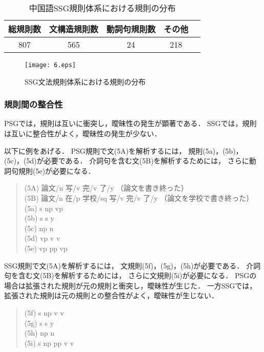 \documentclass[japanese]{jnlp_1.3a}
\begin{document}
\begin{table}[b]
  \begin{center}
    \caption{中国語SSG規則体系における規則の分布}
    \begin{tabular}{|c|c|c|c|c|} \hline
総規則数&文構造規則数 & 動詞句規則数 & その他  \\\hline
807&565&24 & 218     \\\hline
    \end{tabular}
    \label{tab:nrule}
  \end{center}
\end{table}

\begin{figure}[b]
  \begin{center}
       \texttt{[image: 6.eps]}
    \caption{SSG文法規則体系における規則の分布}
    \label{fig:ssgpyra}
  \end{center}
\end{figure}



\subsubsection{規則間の整合性}
PSGでは，規則は互いに衝突し，曖昧性の発生が顕著である．
SSGでは，規則は互いに整合性がよく，曖昧性の発生が少ない．

以下に例をあげる．
PSG規則で文(5A)を解析するには，
規則(5a)，(5b)，(5c)，(5d)が必要である．
介詞句を含む文(5B)を解析するためには，
さらに動詞句規則(5e)が必要になる．
\begin{quotation}\noindent
\文(5A) 論文/n 写/v 完/v 了/y （論文を書き終った）\\
\文(5B) 論文/n 在/p 学校/sq 写/v 完/v 了/y （論文を学校で書き終った）\\
(5a) s  \ya  np vp\\
(5b) s  \ya  s y\\
(5c) np \ya  n\\
(5d) vp \ya  v v\\
(5e) vp \ya  pp vp
\end{quotation}

SSG規則で文(5A)を解析するには，
文規則(5f)，(5g)，(5h)が必要である．
介詞句を含む文(5B)を解析するためには，
さらに文規則(5i)が必要になる．
PSGの場合は拡張された規則が元の規則と衝突し，曖昧性が生じた．
一方SSGでは，拡張された規則は元の規則との整合性がよく，曖昧性が生じない．
\begin{quotation}\noindent
{}(5f) s  \ya  np v v\\
(5g) s  \ya  s y\\
(5h) np  \ya  n\\
(5i) s  \ya  np pp v v
\end{quotation}
\end{document}
